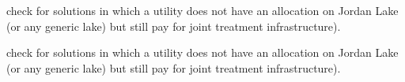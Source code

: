
\begin{DoxyRefList}
\item[\label{todo__todo000001}%
\Hypertarget{todo__todo000001}%
Member \mbox{\hyperlink{classPaperTestProblem_a6db78df74d40f69a750b164caaca75c7}{Paper\+Test\+Problem\+:\+:function\+Evaluation}} (double $\ast$vars, double $\ast$objs, double $\ast$consts) override]check for solutions in which a utility does not have an allocation on Jordan Lake (or any generic lake) but still pay for joint treatment infrastructure).  
\item[\label{todo__todo000002}%
\Hypertarget{todo__todo000002}%
Member \mbox{\hyperlink{classTriangle_a9e95039d098fd61cce1a830b85ed7004}{Triangle\+:\+:function\+Evaluation}} (double $\ast$vars, double $\ast$objs, double $\ast$consts) override]check for solutions in which a utility does not have an allocation on Jordan Lake (or any generic lake) but still pay for joint treatment infrastructure). 
\end{DoxyRefList}